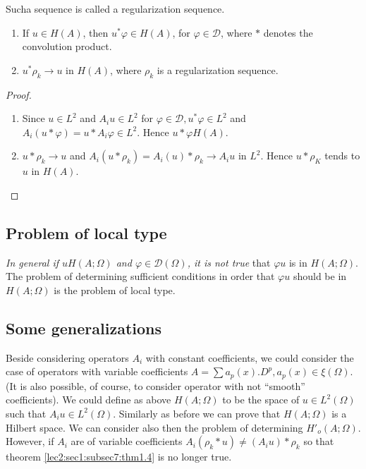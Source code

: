 Such\pageoriginale a sequence is called a regularization sequence.

\begin{theorem}\label{lec2:sec1:subsec7:thm1.4}%
  \begin{enumerate}[1)]
  \item If $u \in H(A)$, then $u^* \varphi \in H(A)$,
    for $\varphi \in \mathscr{D}$, where $*$ denotes the
    convolution product. 
  \item $u^* \rho_k \to u$ in $H(A)$, where $\rho_k$ is a regularization
    sequence. 
  \end{enumerate}
\end{theorem}
\begin{proof}
  \begin{enumerate}[1)]
  \item Since $u \in L^2$ and $A_i u \in L^2$ for
    $\varphi \in \mathscr{D},u ^* \varphi \in L^2$ and
    $A_i (u * \varphi)=u* A_i \varphi \in L^2$. Hence $u *
    \varphi H(A)$. 
  \item $u* \rho _k \to u$ and $A_i (u * \rho_k)= A_i (u)* \rho_k \to
    A_i u$ in $L^2$. Hence $u * \rho _K$ tends to $u$ in $H(A)$. 
  \end{enumerate}
\end{proof}

\subsection{Problem of local type}\label{lec2:sec1:subsec8}
    
\textit{In general if $u H (A; \Omega)$ and $\varphi \in
  \mathscr{D}(\Omega)$, it is not true} that $\varphi u$ is in $H(A;
\Omega)$. The problem of determining sufficient conditions in order that
$\varphi u$ should be in $H(A; \Omega)$ is the problem of local type. 

\subsection{Some generalizations}\label{lec2:sec1:subsec9}

Beside considering operators $A_i$ with constant coefficients, we
could consider the case of operators with variable coefficients $A=
\sum a_p (x).D^p,a_p (x) \in \xi (\Omega)$. (It is also
possible, of course, to consider operator with not ``smooth''
coefficients). We could define as above $H(A; \Omega)$ to be the space
of $u \in L^2 (\Omega)$ such that $A_i u \in L^2
(\Omega)$. Similarly as before we can prove that $H(A; \Omega)$ is a
Hilbert space. We can consider also then the problem of determining
$H'_o (A; \Omega)$. However, if $A_i$ are of variable
coefficients $A_i (\rho _k * u)\neq (A_i u)* \rho _k$ so that theorem
\ref{lec2:sec1:subsec7:thm1.4} is no longer true. 

